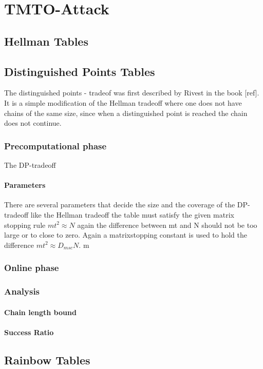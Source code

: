 \chapter{TMTO-Attack}
\label{ch:tmto}

\section{Hellman Tables}

\section{Distinguished Points Tables}
The distinguished points - tradeof was first described by Rivest in
the book [ref]. It is a simple modification of the Hellman tradeoff
where one does not have chains of the same size, since when a
distinguished point is reached the chain does not continue.
\subsection{Precomputational phase}
The DP-tradeoff
\subsubsection{Parameters}
There are several parameters that decide the size and the coverage of
the DP-tradeoff like the Hellman tradeoff the table must satisfy the
given matrix stopping rule $mt^2\approx N$ again the difference between
mt and N should not be too large or to close to zero. Again a
matrixstopping constant is used to hold the difference $mt^2\approx
D_{msc}N$. m 
\subsection{Online phase}
\subsection{Analysis}
\subsubsection{Chain length bound}
\subsubsection{Success Ratio}
\subsubsection{}
\section{Rainbow Tables}
